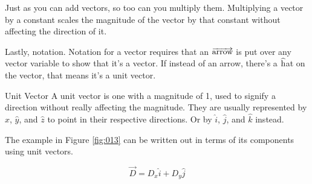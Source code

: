 \documentclass[12pt, letterpaper]{article}
\begin{document}
Just as you can add vectors, so too can you multiply them. Multiplying a vector by a constant
scales the magnitude of the vector by that constant without affecting the direction of it.

Lastly, notation. Notation for a vector requires that an $\overrightarrow{\textup{arrow}}$ is put over
any vector variable to show that it's a vector. If instead of an arrow, there's a $\widehat{\textup{h}}$at on
the vector, that means it's a unit vector.

\begin{definition}{Unit Vector}
  A unit vector is one with a magnitude of 1, used to signify a direction without really
  affecting the magnitude. They are usually represented by $\hat{x}$, $\hat{y}$, and $\hat{z}$ to point in their
  respective directions. Or by $\hat{i}$, $\hat{j}$, and $\hat{k}$ instead.
\end{definition}

The example in Figure \ref{fig:013} can be written out in terms of its components using unit
vectors.

\begin{equation*}
  \overrightarrow{D}=D_x\hat{i}+D_y\hat{j}
\end{equation*}
\end{document}

